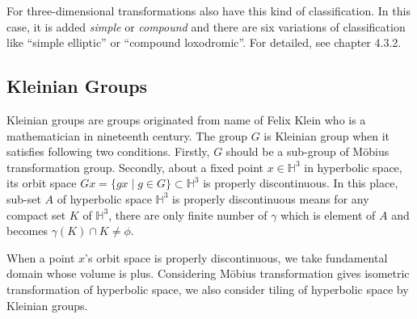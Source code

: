 For three-dimensional transformations also have this kind of
classification.
In this case, it is added \textit{simple} or \textit{compound} and
there are six variations of classification like ``simple elliptic'' or
``compound loxodromic''.
For detailed, see chapter 4.3.2.

\subsection{Kleinian Groups}

Kleinian groups are groups originated from name of Felix Klein who is
a mathematician in nineteenth century.
The group $G$ is Kleinian group when it satisfies following two
conditions. 
Firstly, $G$ should be a sub-group of M\"obius transformation group.
Secondly, about a fixed point $x\in\mathbb{H}^3$ in hyperbolic space,
its orbit space $Gx = \{ gx \mid g\in G\}\subset \mathbb{H}^3$
is properly discontinuous.
In this place, sub-set $A$ of hyperbolic space $\mathbb{H}^3$
is properly discontinuous means
for any compact set $K$ of $\mathbb{H}^3$,
there are only finite number of $\gamma$ which is element of $A$
and becomes $\gamma (K) \cap K \neq \phi$.

When a point $x$'s orbit space is properly discontinuous, we take
fundamental domain whose volume is plus.
Considering M\"obius transformation gives isometric transformation of
hyperbolic space, we also consider tiling of hyperbolic space by
Kleinian groups. 

